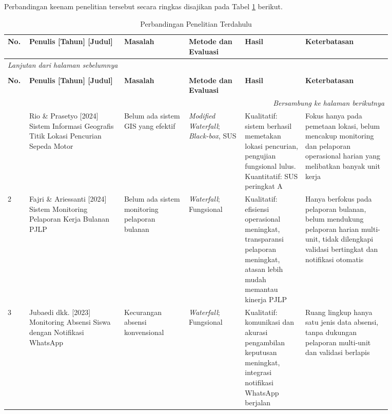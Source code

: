 Perbandingan keenam penelitian tersebut secara ringkas disajikan pada Tabel \ref{table:2.literasi} berikut.

\begin{landscape}
\begin{longtable}{|p{0.03\linewidth}|p{0.22\linewidth}|p{0.15\linewidth}|p{0.13\linewidth}|p{0.14\linewidth}|p{0.20\linewidth}|}
    \caption{Perbandingan Penelitian Terdahulu}
    \label{table:2.literasi}\\
    \hline
    \textbf{No.} & \textbf{Penulis [Tahun] [Judul]} & \textbf{Masalah} & \textbf{Metode dan Evaluasi} & \textbf{Hasil} & \textbf{Keterbatasan} \\
    \hline
    \endfirsthead
    \multicolumn{6}{l}{\textit{Lanjutan dari halaman sebelumnya}} \\
    \caption[]{Perbandingan Penelitian Terdahulu} \\
    \hline
    \textbf{No.} & \textbf{Penulis [Tahun] [Judul]} & \textbf{Masalah} & \textbf{Metode dan Evaluasi} & \textbf{Hasil} & \textbf{Keterbatasan} \\
    \hline
    \endhead
    \hline
    \multicolumn{6}{r}{\textit{Bersambung ke halaman berikutnya}} \\
    \endfoot
    \endlastfoot
    1 & Rio \& Prasetyo [2024] Sistem Informasi Geografis Titik Lokasi Pencurian Sepeda Motor \cite{rio2024gis} & Belum ada sistem GIS yang efektif & \textit{Modified Waterfall}; \textit{Black-box}, SUS & Kualitatif: sistem berhasil memetakan lokasi pencurian, pengujian fungsional lulus. Kuantitatif: SUS peringkat A & Fokus hanya pada pemetaan lokasi, belum mencakup monitoring dan pelaporan operasional harian yang melibatkan banyak unit kerja \\
    \hline
    2 & Fajri \& Ariessanti [2024] Sistem Monitoring Pelaporan Kerja Bulanan PJLP \cite{fajri2024monitoring} & Belum ada sistem monitoring pelaporan bulanan & \textit{Waterfall}; Fungsional & Kualitatif: efisiensi operasional meningkat, transparansi pelaporan meningkat, atasan lebih mudah memantau kinerja PJLP & Hanya berfokus pada pelaporan bulanan, belum mendukung pelaporan harian multi-unit, tidak dilengkapi validasi bertingkat dan notifikasi otomatis \\
    \hline
    3 & Jubaedi dkk. [2023] Monitoring Absensi Siswa dengan Notifikasi WhatsApp \cite{jubaedi2023absensi} & Kecurangan absensi konvensional & \textit{Waterfall}; Fungsional & Kualitatif: komunikasi dan akurasi pengambilan keputusan meningkat, integrasi notifikasi WhatsApp berjalan & Ruang lingkup hanya satu jenis data absensi, tanpa dukungan pelaporan multi-unit dan validasi berlapis \\

\end{longtable}
\end{landscape}
